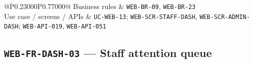 \begin{longtable}{@{}P{0.23000\SRSWidth}P{0.77000\SRSWidth}@{}}
Business rules & \texttt{WEB-\allowbreak{}BR-\allowbreak{}09}, \texttt{WEB-\allowbreak{}BR-\allowbreak{}23} \\[3pt]
Use case /\allowbreak{} screens /\allowbreak{} APIs & \texttt{UC-\allowbreak{}WEB-\allowbreak{}13}; \texttt{WEB-\allowbreak{}SCR-\allowbreak{}STAFF-\allowbreak{}DASH}, \texttt{WEB-\allowbreak{}SCR-\allowbreak{}ADMIN-\allowbreak{}DASH}; \texttt{WEB-\allowbreak{}API-\allowbreak{}019}, \texttt{WEB-\allowbreak{}API-\allowbreak{}051} \\[3pt]
\end{longtable}
\endgroup

\subsection{\texttt{WEB-\allowbreak{}FR-\allowbreak{}DASH-\allowbreak{}03} — Staff attention queue}
\begingroup
\fontsize{9.5}{12}\selectfont
\setlength{\SRSWidth}{\dimexpr\linewidth-2\tabcolsep\relax}
